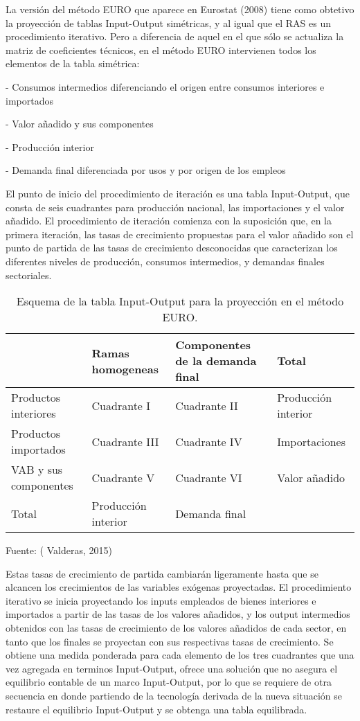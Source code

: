 \documentclass{article}
\begin{document}
La versión del método EURO que aparece en Eurostat (2008) tiene como obtetivo la proyección de tablas Input-Output simétricas, y al igual que el RAS es un procedimiento iterativo. Pero a diferencia de aquel en el que sólo se actualiza la matriz de coeficientes técnicos, en el método EURO intervienen todos los elementos de la tabla simétrica:

- Consumos intermedios diferenciando el origen entre consumos interiores e importados

- Valor añadido y sus componentes

- Producción interior

- Demanda final diferenciada por usos y por origen de los empleos

El punto de inicio del procedimiento de iteración es una tabla Input-Output, que consta de seis cuadrantes para producción nacional, las importaciones y el valor añadido. El procedimiento de iteración comienza con la suposición que, en la primera iteración, las tasas de crecimiento propuestas para el valor añadido son el punto de partida de las tasas de crecimiento desconocidas que caracterizan los diferentes niveles de producción, consumos intermedios, y demandas finales sectoriales.

\begin{table}[htbp]
 \begin{center}
 \begin{tabular}{|l|l|l|l|}
 \hline
  & Ramas homogeneas  &  Componentes de la demanda final & Total  \\
 \hline \hline
 Productos interiores & Cuadrante I & Cuadrante II  & Producción interior\\ \hline
 Productos importados & Cuadrante III & Cuadrante IV  & Importaciones \\ \hline
 VAB y sus componentes & Cuadrante V & Cuadrante VI  & Valor añadido \\ \hline
 Total & Producción interior & Demanda final &   \\ \hline
 \end{tabular}
 \caption{Esquema de la tabla Input-Output para la proyección en el método EURO.}
 \label{tabla:sencilla}
 \end{center}
 \end{table}

Fuente: ( Valderas, 2015)


Estas tasas de crecimiento de partida cambiarán ligeramente hasta que se alcancen los crecimientos de las variables exógenas proyectadas. El procedimiento iterativo se inicia proyectando los inputs empleados de bienes interiores e importados a partir de las tasas de los valores añadidos, y los output intermedios  obtenidos con las tasas de crecimiento de los valores añadidos de cada sector, en tanto que los finales se proyectan con sus respectivas tasas de crecimiento. Se obtiene una medida ponderada para cada elemento de los tres cuadrantes que una vez agregada en terminos Input-Output, ofrece una solución que no asegura el equilibrio contable de un marco Input-Output, por lo que se requiere de otra secuencia en donde partiendo de la tecnología derivada de la nueva situación se restaure el equilibrio Input-Output y se obtenga una tabla equilibrada.
\end{document}
